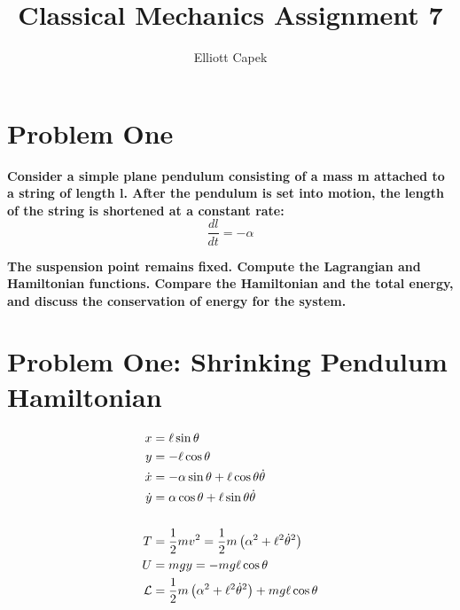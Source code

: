 \documentclass[10pt]{article} %
\title{Classical Mechanics Assignment 7}
\author{Elliott Capek}
\begin{document}
\maketitle{}

\section{Problem One}
\textbf{Consider a simple plane pendulum consisting of a mass m attached to a string of length l. After the pendulum is set into motion, the length of the string is shortened at a constant rate:}
\begin{equation}
  \frac{dl}{dt} = −\alpha
\end{equation}

\textbf{The suspension point remains fixed. Compute the Lagrangian and Hamiltonian functions. Compare the Hamiltonian and the total energy, and discuss the conservation of energy for the system.}

\section{Problem One: Shrinking Pendulum Hamiltonian}


\begin{align*}
  x &= \ell\sin\theta\\
  y &= -\ell\cos\theta\\

  \dot{x} &= -\alpha\sin\theta + \ell\cos\theta\dot{\theta}\\
  \dot{y} &= \alpha\cos\theta + \ell\sin\theta\dot{\theta}\\
  \vspace{1cm}\\
  T &= \frac{1}{2}mv^2 = \frac{1}{2}m\left(\alpha^2+\ell^2\dot{\theta}^2\right)\\
  U &= mgy = -mg\ell\cos\theta\\
  \mathcal{L} &= \frac{1}{2}m\left(\alpha^2+\ell^2\dot{\theta}^2\right) + mg\ell\cos\theta\\
\end{align*}
\end{document}
